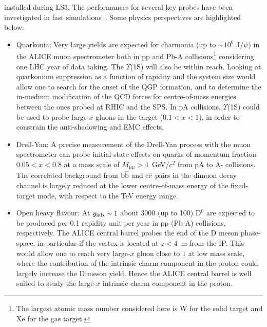 \documentclass[../report.tex]{subfiles}
\begin{document}
installed during LS3. The performances for several key probes have been investigated in fast simulations~\cite{Hadjidakis:2018ifr}. Some physics perspectives are highlighted below: 
\begin{itemize}
\item{Quarkonia: Very large yields are expected for charmonia (up to $\sim 10^{6}$ J/$\psi$) in the ALICE muon spectrometer both in pp and Pb-A collisions\footnote{The largest atomic mass number considered here is W for the solid target and Xe for the gas target.} considering one LHC year of data taking. The $\Upsilon$(1S) will also be within reach. Looking at quarkonium suppression as a function of rapidity and the system size would allow one to search for the onset of the QGP formation, and to determine the in-medium modification of the QCD forces for centre-of-mass energies between the ones probed at RHIC and the SPS. In pA collisions, $\Upsilon$(1S) could be used to probe large-$x$ gluons in the target ($0.1<x<1$), in order to constrain the anti-shadowing and EMC effects.}

\item{Drell-Yan: A precise measurement of the Drell-Yan process with the muon spectrometer can probe initial state effects on quarks of momentum fraction $0.05<x<0.8$ at a mass scale of $M_{\mu\mu}> 4$~GeV/$c^2$ from pA to A- collisions. The correlated background from $\rm b\overline{b}$ and $\rm c\overline{c}$ pairs in the dimuon decay channel is largely reduced at the lower centre-of-mass energy of the fixed-target mode, with respect to the TeV energy range.}

\item{Open heavy flavour: At $y_{\rm lab} \sim 1$ about 3000 (up to 100) D$^{0}$ are expected to be produced per 0.1 rapidity unit per year in pp (Pb-A) collisions, respectively. The ALICE central barrel probes the end of the D meson phase-space, in particular if the vertex is located at $z < 4$~m from the IP. This would allow one to reach very large-$x$ gluon close to 1 at low mass scale, where the contribution of the intrinsic charm component in the proton could largely increase the D meson yield. Hence the ALICE central barrel is well suited to study the large-$x$ intrinsic charm component in the proton.}


\end{itemize}
\end{document}
